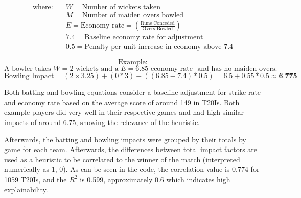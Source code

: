 \documentclass{article}[12pt]
\begin{document}
\[
\begin{aligned}
\text{where:} \quad 
& W = \text{Number of wickets taken} \\
& M = \text{Number of maiden overs bowled} \\
& E = \text{Economy rate} = \left( \frac{\text{Runs Conceded}}{\text{Overs Bowled}} \right) \\
& 7.4 = \text{Baseline economy rate for adjustment} \\
& 0.5 = \text{Penalty per unit increase in economy above 7.4}
\end{aligned}
\]

\[
\text{Example:}
\]
\[
\text{A bowler takes } W = 2 \text{ wickets and a } E = 6.85 \text{ economy rate } \text{ and has no maiden overs.}
\]
\[
\text{Bowling Impact} = (2 \times 3.25) + (0 * 3) - ((6.85 - 7.4) * 0.5) = 6.5 + 0.55 * 0.5 \approx \textbf{6.775}
\]

Both batting and bowling equations consider a baseline adjustment for strike rate and economy rate based on the average score of around 149 in T20Is. \parencite{statsguru_2025_total} Both example players did very well in their respective games and had high similar impacts of around 6.75, showing the relevance of the heuristic.

Afterwards, the batting and bowling impacts were grouped by their totals by game for each team. Afterwards, the differences between total impact factors are used as a heuristic to be correlated to the winner of the match (interpreted numerically as 1, 0). As can be seen in the code, the correlation value is 0.774 for 1059 T20Is, and the \(R^2\) is 0.599, approximately 0.6 which indicates high explainability.
\end{document}
